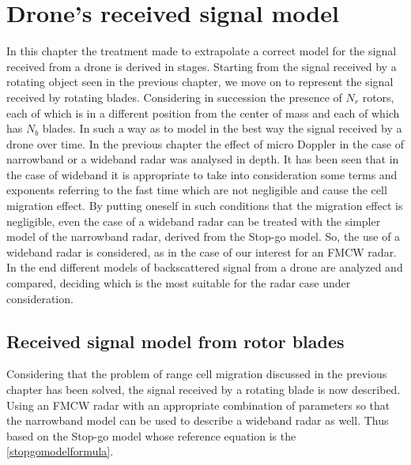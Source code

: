 \chapter{Drone's received signal model}
In this chapter the treatment made to extrapolate a correct model for the signal received from a drone is derived in stages. Starting from the signal received by a rotating object seen in the previous chapter, we move on to represent the signal received by rotating blades. Considering in succession the presence of $N_r$ rotors, each of which is in a different position from the center of mass and each of which has $N_b$ blades. In such a way as to model in the best way the signal received by a drone over time. In the previous chapter the effect of micro Doppler in the case of narrowband or a wideband radar was analysed in depth. It has been seen that in the case of wideband it is appropriate to take into consideration some terms and exponents referring to the fast time which are not negligible and cause the cell migration effect. By putting oneself in such conditions that the migration effect is negligible, even the case of a wideband radar can be treated with the simpler model of the narrowband radar, derived from the Stop-go model. 
So, the use of a wideband radar is considered, as in the case of our interest for an FMCW radar. In the end different models of backscattered signal from a drone are analyzed and compared, deciding which is the most suitable for the radar case under consideration.


\section{Received signal model from rotor blades}
Considering that the problem of range cell migration discussed in the previous chapter has been solved, the signal received by a rotating blade is now described.
Using an FMCW radar with an appropriate combination of parameters so that the narrowband model can be used to describe a wideband radar as well. Thus based on the Stop-go model whose reference equation is the \ref{stopgomodelformula}.